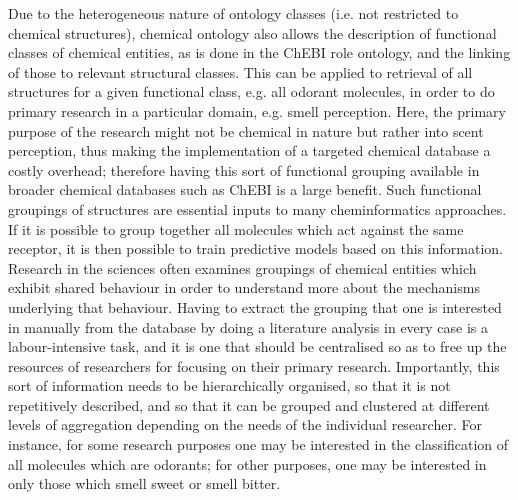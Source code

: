 \documentclass[10pt]{bmc_article}
\newenvironment{bmcformat}{\baselineskip20pt\sloppy\setboolean{publ}{false}}{\baselineskip20pt\sloppy}
\begin{document}
\begin{bmcformat}
Due to the heterogeneous nature of ontology classes (i.e. not restricted to chemical structures), chemical ontology also allows the description of functional classes of chemical entities, as is done in the ChEBI role ontology, and the linking of those to relevant structural classes.  
This can be applied to retrieval of all structures for a given functional class, e.g. all odorant molecules, in order to do primary research in a particular domain, e.g. smell perception. Here, the primary purpose of the research might not be chemical in nature but rather into scent perception, thus making the implementation of a targeted chemical database a costly overhead; therefore having this sort of functional grouping available in broader chemical databases such as ChEBI is a large benefit.
Such functional groupings of structures are essential inputs to many cheminformatics approaches.  If it is possible to group together all molecules which act against the same receptor, it is then possible to train predictive models based on this information.   %
Research in the sciences often examines groupings of chemical entities which exhibit shared behaviour in order to understand more about the mechanisms underlying that behaviour. 
Having to extract the grouping that one is interested in manually from the database by doing a literature analysis in every case is a labour-intensive task, and it is one that should be centralised so as to free up the resources of researchers for focusing on their primary research. 
Importantly, this sort of information needs to be hierarchically organised, so that it is not repetitively described, and so that it can be grouped and clustered at different levels of aggregation depending on the needs of the individual researcher. For instance, for some research purposes one may be interested in the classification of all molecules which are odorants; for other purposes, one may be interested in only those which smell sweet or smell bitter. 



\end{bmcformat}
\end{document}
